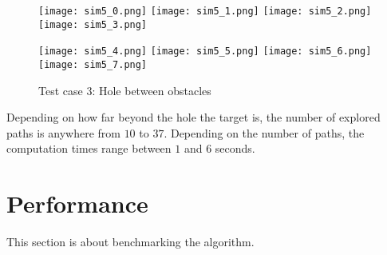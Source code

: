 \begin{figure}[h]
  \centering
  \begin{minipage}{\textwidth}
    \texttt{[image: sim5\_0.png]}
    \texttt{[image: sim5\_1.png]}
    \texttt{[image: sim5\_2.png]}
    \texttt{[image: sim5\_3.png]}

    \texttt{[image: sim5\_4.png]}
    \texttt{[image: sim5\_5.png]}
    \texttt{[image: sim5\_6.png]}
    \texttt{[image: sim5\_7.png]}
  \end{minipage}
  \caption{Test case 3: Hole between obstacles}\label{fig:sim5}
\end{figure}

Depending on how far beyond the hole the target is, the number of explored paths is anywhere from $10$ to $37$. Depending on the number of paths, the computation times range between $1$ and $6$ seconds.

\section{Performance}

This section is about benchmarking the algorithm.
